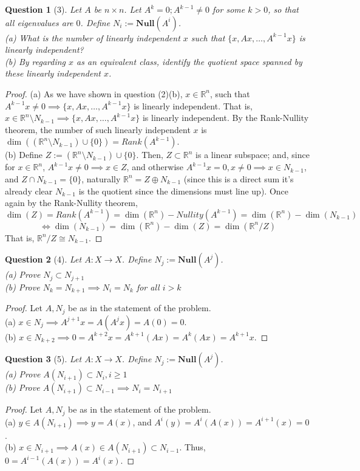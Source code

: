 \documentclass[11pt]{article}
\theoremstyle{quest}
\newtheorem*{question}{Question}
\begin{document}
\begin{question}[3]
Let $A$ be $n \times n$. Let $A^k = 0; A^{k-1} \ne 0$ for some $k > 0$, so that all eigenvalues are $0$. Define $N_i := \mathbf{Null}(A^i)$.
\\(a) What is the number of linearly independent $x$ such that $\{x, Ax, \ldots, A^{k-1}x\}$ is linearly independent?
\\(b) By regarding $x$ as an equivalent class, identify the quotient space spanned by these linearly independent $x$. 
\end{question}
\begin{proof}
(a) As we have shown in question (2)(b), $x \in \mathbb{R}^n$, such that $A^{k-1} x \ne 0 \implies \{x, Ax, \ldots, A^{k-1}x\}$ is linearly independent. That is, $x \in \mathbb{R}^n \setminus N_{k-1} \implies \{x, Ax, \ldots, A^{k-1}x\}$ is linearly independent. By the Rank-Nullity theorem, the number of such linearly independent $x$ is $\dim((\mathbb{R}^n \setminus N_{k-1}) \cup \{0\}) = Rank(A^{k-1})$.
\\(b) Define $Z := (\mathbb{R}^n \setminus N_{k-1}) \cup \{0\}$. Then, $Z \subset \mathbb{R}^n$ is a linear subspace; and, since for $x \in \mathbb{R}^n$, $A^{k-1}x \ne 0 \implies x \in Z$, and otherwise $A^{k-1}x = 0, x \ne 0 \implies x \in N_{k-1}$, and $Z \cap N_{k-1} = \{0\}$, naturally $\mathbb{R}^n = Z \oplus N_{k-1}$ (since this is a direct sum it's already clear $N_{k-1}$ is the quotient since the dimensions must line up). Once again by the Rank-Nullity theorem, $$\dim(Z) = Rank(A^{k-1}) = \dim(\mathbb{R}^n) - Nullity(A^{k-1}) = \dim(\mathbb{R}^n) - \dim(N_{k-1})$$
$$\iff \dim(N_{k-1}) = \dim(\mathbb{R}^n) - \dim(Z) = \dim(\mathbb{R}^n / Z)$$
That is, $\mathbb{R}^n / Z \cong N_{k-1}$.
\end{proof}
\begin{question}[4]
Let $A: X \rightarrow X$. Define $N_j := \mathbf{Null}(A^j)$.
\\(a) Prove $N_j \subset N_{j+1}$
\\(b) Prove $N_k = N_{k+1} \implies N_i = N_k$ for all $i > k$
\end{question}
\begin{proof}
  Let $A, N_j$ be as in the statement of the problem.
  \\(a) $x \in N_j \implies A^{j+1}x = A(A^j x) = A(0) = 0$.
  \\(b) $x \in N_{k+2} \implies 0 = A^{k+2}x = A^{k+1}(Ax) = A^k(Ax) = A^{k+1}x$.
\end{proof}
\begin{question}[5]
Let $A: X \rightarrow X$. Define $N_j := \mathbf{Null}(A^j)$.
\\(a) Prove $A(N_{i+1}) \subset N_i, i \ge 1$
\\(b) Prove $A(N_{i+1}) \subset N_{i-1} \implies N_i = N_{i+1}$
\end{question}
\begin{proof}
Let $A, N_j$ be as in the statement of the problem.
  \\(a) $y \in A(N_{i+1}) \implies y = A(x)$, and $A^i(y) = A^i(A(x)) = A^{i+1}(x) = 0$.
  \\(b) $x \in N_{i+1} \implies A(x) \in A(N_{i+1}) \subset N_{i-1}$. Thus, $0 = A^{i-1}(A(x)) = A^i(x)$.
\end{proof}
\end{document}
